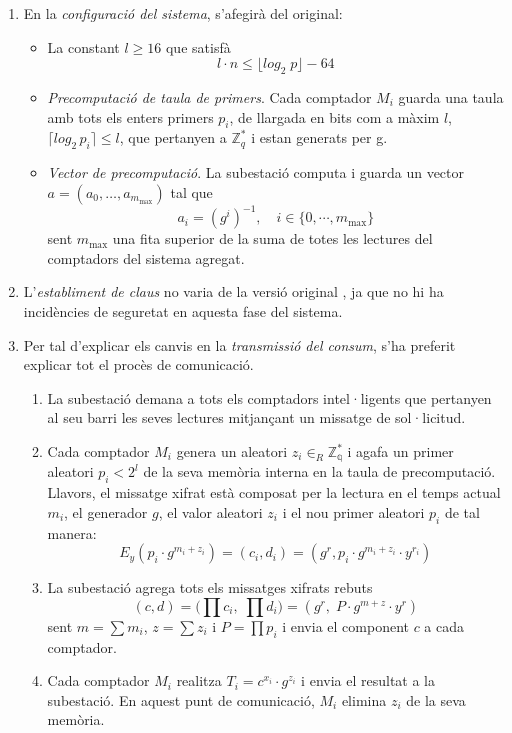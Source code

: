 \begin{enumerate}
	\item En la \textit{configuració del sistema}, s'afegirà del original:
	\begin{itemize}
		\item La constant $l \ge 16 $ que satisfà \[l \cdot n \le \lfloor log_2 \; p \rfloor - 64\]
		\item \textit{Precomputació de taula de primers}. Cada comptador $M_i$ guarda una taula amb tots els enters primers $p_i$, de llargada en bits com a màxim $l$, $\lceil log_2 \, p_i \rceil \le l$, que pertanyen a $\mathbb{Z}_q^*$ i estan generats per g.
		\item \textit{Vector de precomputació}. La subestació computa i guarda un vector $a = (a_0, \dots, a_{m_{\textrm{max}}})$ tal que \[a_i = (g^i)^{-1}, \quad i \in \{0, \cdots, m_{\textrm{max}}\}\] sent $m_{\textrm{max}}$ una fita superior de la suma de totes les lectures del comptadors del sistema agregat.
	\end{itemize}
	\item L'\textit{establiment de claus} no varia de la versió original \cite{busom}, ja que no hi ha incidències de seguretat en aquesta fase del sistema.
	\item Per tal d'explicar els canvis en la \textit{transmissió del consum}, s'ha preferit explicar tot el procès de comunicació.
	\begin{enumerate}
		\item La subestació demana a tots els comptadors intel·ligents que pertanyen al seu barri les seves lectures mitjançant un missatge de sol·licitud.
		\item Cada comptador $M_i$ genera un aleatori $z_i \in_R \mathbb{Z_q^*}$ i agafa un primer aleatori $p_i < 2^l$ de la seva memòria interna en la taula de precomputació. Llavors, el missatge xifrat està composat per la lectura en el temps actual $m_i$, el generador $g$, el valor aleatori $z_i$ i el nou primer aleatori $p_i$ de tal manera:
		\[E_y(p_i \cdot g^{m_i + z_i}) = (c_i, d_i) = (g^r, p_i \cdot g^{m_i + z_i} \cdot y^{r_i})\]
		\item La subestació agrega tots els missatges xifrats rebuts
		\[(c, d) = \Big( \prod c_i, \; \prod d_i \Big) = (g^r,\; P \cdot g^{m + z} \cdot y^r)\]
		sent $m = \sum m_i$, $z = \sum z_i$ i $P = \prod p_i$ i envia el component $c$ a cada comptador.
		\item Cada comptador $M_i$ realitza $T_i = c^{x_i} \cdot g^{z_i}$ i envia el resultat a la subestació. En aquest punt de comunicació, $M_i$ elimina $z_i$ de la seva memòria.

\end{enumerate}
\end{enumerate}
